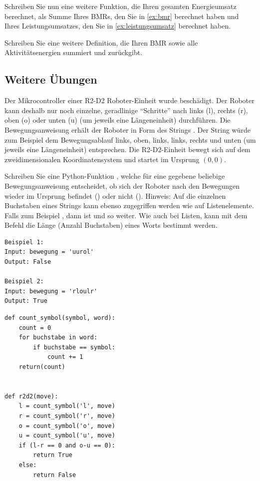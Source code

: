 \begin{mysubmission}
Schreiben Sie nun eine weitere Funktion, die Ihren gesamten Energieumsatz berechnet, als Summe Ihres BMRs, den Sie in \cref{ex:bmr} berechnet haben und Ihres Leistungsumsatzes, den Sie in \cref{ex:leistungsumsatz} berechnet haben.
\end{mysubmission}

\begin{myexercise}
Schreiben Sie eine weitere Definition, die Ihren \gls{BMR} sowie alle Aktivitätsenergien summiert und zurückgibt.
\end{myexercise}

\subsection{Weitere Übungen}

\begin{myexercise}

Der Mikrocontroller einer R2-D2 Roboter-Einheit wurde beschädigt. Der Roboter kann deshalb nur noch einzelne, geradlinige \enquote{Schritte} nach links (l), rechts (r), oben (o) oder unten (u) (um jeweils eine Längeneinheit) durchführen. Die Bewegungsanweisung erhält der Roboter in Form des Strings . Der String  würde zum Beispiel dem Bewegungsablauf links, oben, links, links, rechts und unten (um jeweils eine Längeneinheit) entsprechen. Die R2-D2-Einheit bewegt sich auf dem zweidimensionalen Koordinatensystem und startet im Ursprung $(0,0)$.


Schreiben Sie eine Python-Funktion , welche für eine gegebene beliebige Be\-we\-gungs\-an\-wei\-sung  entscheidet, ob sich der Roboter nach den Bewegungen wieder im Ursprung befindet () oder nicht (). Hinweis: Auf die einzelnen Buchstaben eines Strings kann ebenso zugegriffen werden wie auf Listenelemente. Falls zum Beispiel , dann ist  und so weiter. Wie auch bei Listen, kann mit dem Befehl  die Länge (Anzahl Buchstaben) eines Worts bestimmt werden.

\begin{lstlisting}[numbers=none,framexleftmargin=0em,xleftmargin=0em]
Beispiel 1:
Input: bewegung = 'uurol'
Output: False

Beispiel 2:
Input: bewegung = 'rloulr'
Output: True
\end{lstlisting}

\begin{myanswer}
\begin{lstlisting}
def count_symbol(symbol, word):
    count = 0
    for buchstabe in word:
        if buchstabe == symbol:
            count += 1
    return(count)


def r2d2(move):
    l = count_symbol('l', move)
    r = count_symbol('r', move)
    o = count_symbol('o', move)
    u = count_symbol('u', move)
    if (l-r == 0 and o-u == 0):
        return True
    else:
        return False
\end{lstlisting}
\end{myanswer}
\end{myexercise}